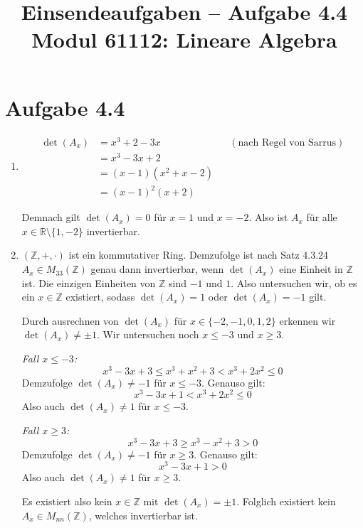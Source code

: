 \documentclass[a4paper,12pt]{article}
\title{Einsendeaufgaben -- Aufgabe 4.4\\[0.5em]
\large Modul 61112: Lineare Algebra}
\author{}
\date{}
\begin{document}
\maketitle

\section*{Aufgabe 4.4}

\begin{enumerate}[label=\alph*)]
  \item
  \begin{align*}
    \det(A_x) &= x^3 + 2 - 3x && (\text{nach Regel von Sarrus}) \\
              &= x^3 - 3x + 2 \\
              &= (x-1)(x^2 + x - 2) \\
              &= (x-1)^2 (x+2)
  \end{align*}

  Demnach gilt $\det(A_x) = 0$ für $x = 1$ und $x = -2$. Also ist $A_x$ für alle
  $x \in \mathbb{R} \setminus \{1, -2\}$ invertierbar.

  \item
  $(\mathbb{Z}, +, \cdot)$ ist ein kommutativer Ring. Demzufolge ist nach
  Satz 4.3.24 $A_x \in M_{33}(\mathbb{Z})$ genau dann invertierbar, wenn
  $\det(A_x)$ eine Einheit in $\mathbb{Z}$ ist. Die einzigen Einheiten von
  $\mathbb{Z}$ sind $-1$ und $1$. Also untersuchen wir, ob es ein
  $x \in \mathbb{Z}$ existiert, sodass $\det(A_x) = 1$ oder $\det(A_x) = -1$
  gilt.

  Durch ausrechnen von $\det(A_x)$ für $x \in \{-2, -1, 0, 1, 2\}$ erkennen wir
  $\det(A_x) \neq \pm 1$. Wir untersuchen noch $x \leq -3$ und $x \geq 3$.

  \bigskip

  \textit{Fall $x \leq -3$:}
  \[
    x^3 - 3x + 3 \leq x^3 + x^2 + 3 < x^3 + 2x^2 \leq 0
  \]
  Demzufolge $\det(A_x) \neq -1$ für $x \leq -3$.
  Genauso gilt:
  \[
    x^3 - 3x + 1 < x^3 + 2x^2 \leq 0
  \]
  Also auch $\det(A_x) \neq 1$ für $x \leq -3$.

  \bigskip

  \textit{Fall $x \geq 3$:}
  \[
    x^3 - 3x + 3 \geq x^3 - x^2 + 3 > 0
  \]
  Demzufolge $\det(A_x) \neq -1$ für $x \geq 3$.
  Genauso gilt:
  \[
    x^3 - 3x + 1 > 0
  \]
  Also auch $\det(A_x) \neq 1$ für $x \geq 3$.

  \bigskip
  \bigskip
  \bigskip

  Es existiert also kein $x \in \mathbb{Z}$ mit $\det(A_x) = \pm 1$. Folglich
  existiert kein $A_x \in M_{nn}(\mathbb{Z})$, welches invertierbar ist.
\end{enumerate}
\end{document}
